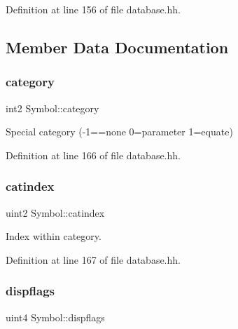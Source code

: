 Definition at line 156 of file database.\+hh.



\subsection{Member Data Documentation}
\mbox{\label{class_symbol_a4cbfc5ebf286a35b8f961618c2f2034c}} 
\subsubsection{\texorpdfstring{category}{category}}
{\footnotesize\ttfamily int2 Symbol\+::category\hspace{0.3cm}{\ttfamily [protected]}}



Special category (-\/1==none 0=parameter 1=equate) 



Definition at line 166 of file database.\+hh.

\mbox{\label{class_symbol_a3f20efe66a14d812fd95a57c3a0497cd}} 
\subsubsection{\texorpdfstring{catindex}{catindex}}
{\footnotesize\ttfamily uint2 Symbol\+::catindex\hspace{0.3cm}{\ttfamily [protected]}}



Index within category. 



Definition at line 167 of file database.\+hh.

\mbox{\label{class_symbol_a58776a81e4ba35c90bb0d3bf2fea5c32}} 
\subsubsection{\texorpdfstring{dispflags}{dispflags}}
{\footnotesize\ttfamily uint4 Symbol\+::dispflags\hspace{0.3cm}{\ttfamily [protected]}}



